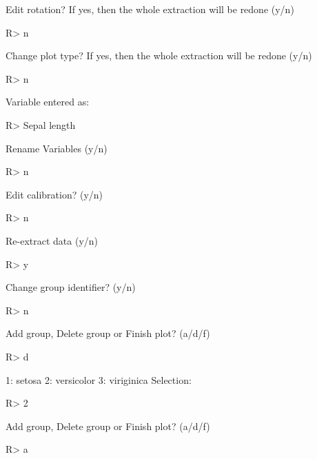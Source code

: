 \documentclass[12pt]{article}
\begin{document}
\begin{CodeChunk}

\begin{CodeOutput}
Edit rotation? If yes, then the whole extraction will be redone (y/n) 
\end{CodeOutput}
\begin{CodeInput}
R> n
\end{CodeInput}
\begin{CodeOutput}
Change plot type? If yes, then the whole extraction will be redone (y/n) 
\end{CodeOutput}
\begin{CodeInput}
R> n
\end{CodeInput}
\begin{CodeOutput}
Variable entered as: 
\end{CodeOutput}
\begin{CodeInput}
R> Sepal length
\end{CodeInput}
\begin{CodeOutput}
Rename Variables (y/n) 
\end{CodeOutput}
\begin{CodeInput}
R> n
\end{CodeInput}
\begin{CodeOutput}
Edit calibration? (y/n) 
\end{CodeOutput}
\begin{CodeInput}
R> n
\end{CodeInput}
\begin{CodeOutput}
Re-extract data (y/n) 
\end{CodeOutput}
\begin{CodeInput}
R> y
\end{CodeInput}
\begin{CodeOutput}
Change group identifier? (y/n) 
\end{CodeOutput}
\begin{CodeInput}
R> n
\end{CodeInput}
\begin{CodeOutput}
Add group, Delete group or Finish plot? (a/d/f) 
\end{CodeOutput}
\begin{CodeInput}
R> d
\end{CodeInput}
\begin{CodeOutput}
1: setosa
2: versicolor
3: viriginica
Selection: 
\end{CodeOutput}
\begin{CodeInput}
R> 2
\end{CodeInput}
\begin{CodeOutput}
Add group, Delete group or Finish plot? (a/d/f) 
\end{CodeOutput}
\begin{CodeInput}
R> a
\end{CodeInput}

\end{CodeChunk}
\end{document}
